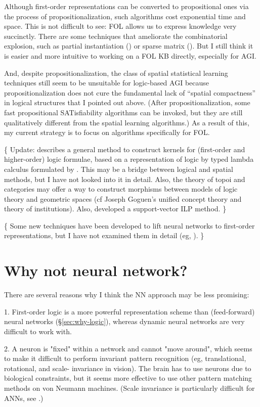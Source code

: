 \documentclass[a4paper]{report}
\begin{document}
Although first-order representations can be converted to propositional ones via the process of propositionalization, such algorithms cost exponential time and space.  This is not difficult to see:  FOL allows us to express knowledge very succinctly.  There are some techniques that ameliorate the combinatorial explosion, such as partial instantiation (\citep*{Chandru1999}) or sparse matrix (\citep*{Domingos2008}).  But I still think it is easier and more intuitive to working on a FOL KB directly, especially for AGI.

And, despite propositionalization, the class of spatial statistical learning techniques still seem to be unsuitable for logic-based AGI because propositionalization does not cure the fundamental lack of ``spatial compactness'' in logical structures that I pointed out above.  (After propositionalization, some fast propositional SATisfiability algorithms can be invoked, but they are still qualitatively different from the spatial learning algorithms.)  As a result of this, my current strategy is to focus on algorithms specifically for FOL.

\{ Update:  \citep*{Gartner2008} describes a general method to construct kernels for (first-order and higher-order) logic formulae, based on a representation of logic by typed lambda calculus formulated by \citep*{Lloyd2003}.  This may be a bridge between logical and spatial methods, but I have not looked into it in detail.  Also, the theory of topoi and categories may offer a way to construct morphisms between models of logic theory and geometric spaces (cf Joseph Goguen's unified concept theory and theory of institutions).  Also, \citep*{Muggleton2005} developed a support-vector ILP method. \}

\{ Some new techniques have been developed to lift neural networks to first-order representations, but I have not examined them in detail (eg, \citep*{Garcez2009}).  \}

\section{Why not neural network?}

There are several reasons why I think the NN approach may be less promising:

1.  First-order logic is a more powerful representation scheme than (feed-forward) neural networks (\S\ref{sec:why-logic}), whereas dynamic neural networks are very difficult to work with.

2.  A neuron is "fixed" within a network and cannot "move around", which seems to make it difficult to perform invariant pattern recognition (eg, translational, rotational, and scale- invariance in vision). The brain has to use neurons due to biological constraints, but it seems more effective to use other pattern matching methods on von Neumann machines. (Scale invariance is particularly difficult for ANNs, see \citep*{Muresan2004}.)
\end{document}
